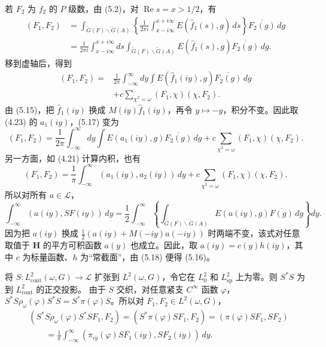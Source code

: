 若 $F_2$ 为 $f_2$ 的 $P$ 级数，由 (5.2)，对 $\operatorname{Re}s=x>1/2$，有
\[
\begin{aligned}
 (F_1,F_2)
 &=\int_{\widetilde G(F)\backslash\widetilde G(A)}
 \left\{\frac1{2\pi i}\int_{x-i\infty}^{x+i\infty}E(\widehat f_1(s),g)\,ds\right\}
 \overline{F_2(g)}\,dg\\
 &=\frac1{2\pi i}\int_{x-i\infty}^{x+i\infty}ds
 \int_{\widetilde G(F)\backslash\widetilde G(A)}E(\widehat f_1(s),g)\overline{F_2(g)}\,dg.
\end{aligned}
\]
移到虚轴后，得到
\begin{equation}
\begin{split}
 (F_1,F_2)={}&\frac1{2\pi}\int_{-\infty}^{\infty}dy
 \int E(\widehat f_1(iy),g)\overline{F_2(g)}\,dg\\
 &+c\sum_{\chi^2=\omega}(F_1,\chi)(\chi,F_2).
\end{split}\tag{5.17}
\end{equation}
由 (5.15)，把 $\widehat f_1(iy)$ 换成 $M(iy)\widehat f_1(iy)$，再令 $y\mapsto-y$，积分不变。因此取 (4.23) 的 $a_1(iy)$，(5.17) 变为
\[
 (F_1,F_2)=\frac1{2\pi}\int_{-\infty}^{\infty}dy\int
 E(a_1(iy),g)\overline{F_2(g)}\,dg
 +c\sum_{\chi^2=\omega}(F_1,\chi)(\chi,F_2).
\]
另一方面，如 (4.21) 计算内积，也有
\[
 (F_1,F_2)=\frac1\pi\int_{-\infty}^{\infty}(a_1(iy),a_2(iy))\,dy
 +c\sum_{\chi^2=\omega}(F_1,\chi)(\chi,F_2).
\]
所以对所有 $a\in\mathcal L$，
\begin{equation}
 \int_{-\infty}^{\infty}(a(iy),SF(iy))\,dy
 =\frac12\int_{-\infty}^{\infty}
 \left\{\int_{\widetilde G(F)\backslash\widetilde G(A)}E(a(iy),g)\overline{F(g)}\,dg\right\}dy.\tag{5.18}
\end{equation}
因为把 $a(iy)$ 换成 $\tfrac12(a(iy)+M(-iy)a(-iy))$ 时两端不变，该式对任意取值于
$\mathbf H$ 的平方可积函数 $a(y)$ 也成立。因此，取 $a(iy)=c(y)h(iy)$，其中 $c$ 为标量函数、$h$ 为“常截面”，由 (5.18) 便得 (5.16)。

将 $S:L_{\mathrm{cont}}^2(\omega,G)\to\mathcal L$ 扩张到 $L^2(\omega,G)$，令它在
$L_0^2$ 和 $L_{\mathrm{sp}}^2$ 上为零。则 $S^*S$ 为到 $L_{\mathrm{cont}}^2$ 的正交投影。
由于 $S$ 交织，对任意紧支 $C^\infty$ 函数 $\varphi$，
$S^*S\rho_\omega(\varphi)S^*S=S^*\pi(\varphi)S$。所以对 $F_1,F_2\in L^2(\omega,G)$，
\begin{equation}
\begin{split}
 &(S^*S\rho_\omega(\varphi)S^*SF_1,F_2)
 =(S^*\pi(\varphi)SF_1,F_2)=(\pi(\varphi)SF_1,SF_2)\\
 &\qquad=\frac1\pi\int_{-\infty}^{\infty}
 (\pi_{iy}(\varphi)SF_1(iy),SF_2(iy))\,dy.
\end{split}\tag{5.19}
\end{equation}

